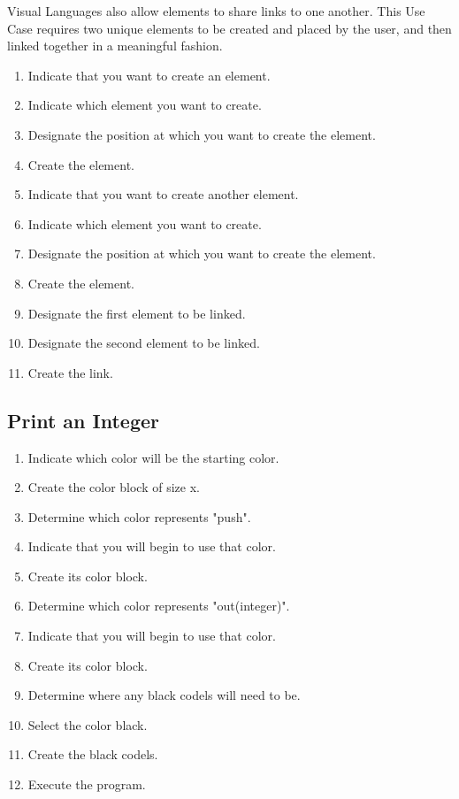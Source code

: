 Visual Languages also allow elements to share links to one another. This
Use Case requires two unique elements to be created and placed by the user,
and then linked together in a meaningful fashion.

\begin{enumerate}
  \item Indicate that you want to create an element.
  \item Indicate which element you want to create.
  \item Designate the position at which you want to create the element.
  \item Create the element.
  \item Indicate that you want to create another element.
  \item Indicate which element you want to create.
  \item Designate the position at which you want to create the element.
  \item Create the element.
  \item Designate the first element to be linked.
  \item Designate the second element to be linked.
  \item Create the link.
\end{enumerate}

\subsection{Print an Integer}
\label{app:euc_print_integer}

\begin{enumerate}
  \item Indicate which color will be the starting color.
  \item Create the color block of size x.
  \item Determine which color represents "push".
  \item Indicate that you will begin to use that color.
  \item Create its color block.
  \item Determine which color represents "out(integer)".
  \item Indicate that you will begin to use that color.
  \item Create its color block.
  \item Determine where any black codels will need to be.
  \item Select the color black.
  \item Create the black codels.
  \item Execute the program.
\end{enumerate}

